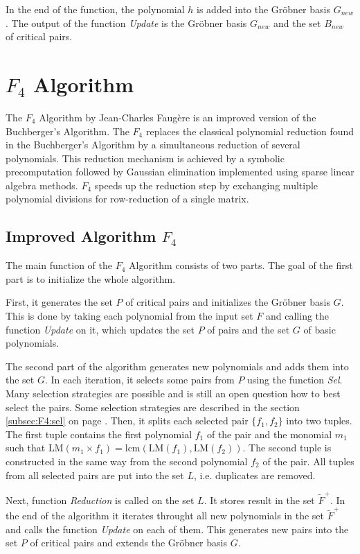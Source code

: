 In the end of the function, the polynomial $h$ is added into the Gr\"obner basis $G_{new}$. The output of the function \textit{Update} is the Gr\"obner basis $G_{new}$ and the set $B_{new}$ of critical pairs.



\section{$F_4$ Algorithm}
The $F_4$ Algorithm \cite{F4} by Jean-Charles Faug\`ere is an improved version of the Buchberger's Algorithm. The $F_4$ replaces the classical polynomial reduction found in the Buchberger's Algorithm by a simultaneous reduction of several polynomials. This reduction mechanism is achieved by a symbolic precomputation followed by Gaussian elimination implemented using sparse linear algebra methods. $F_4$ speeds up the reduction step by exchanging multiple polynomial divisions for row-reduction of a single matrix.

\subsection{Improved Algorithm $F_4$}
The main function of the $F_4$ Algorithm consists of two parts. The goal of the first part is to initialize the whole algorithm.

First, it generates the set $P$ of critical pairs and initializes the Gr\"obner basis $G$. This is done by taking each polynomial from the input set $F$ and calling the function \textit{Update} on it, which updates the set $P$ of pairs and the set $G$ of basic polynomials.

The second part of the algorithm generates new polynomials and adds them into the set $G$. In each iteration, it selects some pairs from $P$ using the function \textit{Sel}. Many selection strategies are possible and is still an open question how to best select the pairs. Some selection strategies are described in the section \ref{subsec:F4:sel} on page \pageref{subsec:F4:sel}. Then, it splits each selected pair $\{f_1, f_2\}$ into two tuples. The first tuple contains the first polynomial $f_1$ of the pair and the monomial $m_1$ such that $\textrm{LM}(m_1 \times f_1) = \textrm{lcm}(\textrm{LM}(f_1),\textrm{LM}(f_2))$. The second tuple is constructed in the same way from the second polynomial $f_2$ of the pair. All tuples from all selected pairs are put into the set $L$, i.e. duplicates are removed.

Next, function \textit{Reduction} is called on the set $L$. It stores result in the set $\tilde{F}^+$. In the end of the algorithm it iterates throught all new polynomials in the set $\tilde{F}^+$ and calls the function \textit{Update} on each of them. This generates new pairs into the set $P$ of critical pairs and extends the Gr\"obner basis $G$.

